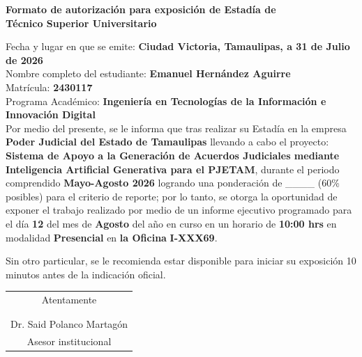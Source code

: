 \documentclass[12pt]{article}
\newcommand{\NombreAlumno}{Emanuel Hernández Aguirre}
\newcommand{\NombreProyecto}{Sistema de Apoyo a la Generación de Acuerdos Judiciales mediante Inteligencia Artificial Generativa para el PJETAM}
\newcommand{\UnidadEconomica}{Poder Judicial del Estado de Tamaulipas}
\newcommand{\nasesorinstitucional}{Dr. Said Polanco Martagón}
\newcommand{\Matricula}           {2430117}  %
\newcommand{\ncuatrimestre}{Mayo-Agosto 2026}
\newcommand{\fechaAutorizacionInforme}               {31 de Julio de 2026}
\newcommand{\DiaEvaluacionPesentacion}{12}
\newcommand{\MesEvaluacionPesentacion}{Agosto}
\newcommand{\HoraEvaluacionPesentacion}{10:00 hrs}
\newcommand{\modalidadEvaluacionPesentacion}{Presencial} %
\newcommand{\tipoAulaOficinaEnlacePesentacion}{la Oficina} %
\newcommand{\AulaEvaluacionOEnlaceMeetPesentacion}{I-XXX69} %
\newcommand{\ncarrera}            {Ingeniería en Tecnologías de la Información e Innovación Digital}
\begin{document}
\begin{center}
{\Large \textbf{Formato de autorización para exposición de Estadía de}}\\[0.125cm]
{\Large \textbf{Técnico Superior Universitario}}\\[0.25cm]
\end{center}

\noindent
Fecha y lugar en que se emite: \textbf{Ciudad Victoria, Tamaulipas, a \fechaAutorizacionInforme } \\[0.125cm]
Nombre completo del estudiante: \textbf{\NombreAlumno} \\[0.125cm]
Matrícula: \textbf{\Matricula}  \\[0.125cm]
Programa Académico: \textbf{\ncarrera}  \\[0.25cm]

\noindent
Por medio del presente, se le informa que tras realizar su Estadía en la empresa \textbf{\UnidadEconomica} llevando a cabo el proyecto: \textbf{\NombreProyecto}, durante el periodo comprendido \textbf{\ncuatrimestre} logrando una ponderación de \_\_\_\_  (60\% posibles) para el criterio de reporte; por lo tanto, se otorga la oportunidad de exponer el trabajo realizado por medio de un informe ejecutivo programado para el día \textbf{\DiaEvaluacionPesentacion} del mes de \textbf{\MesEvaluacionPesentacion} del año en curso en un horario de \textbf{\HoraEvaluacionPesentacion} en modalidad \textbf{\modalidadEvaluacionPesentacion} en \textbf{\tipoAulaOficinaEnlacePesentacion} \textbf{\AulaEvaluacionOEnlaceMeetPesentacion}.

\vspace{0.25cm}

\noindent
Sin otro particular, se le recomienda estar disponible para iniciar su exposición 10 minutos antes de la indicación oficial.

\vspace{0.5cm}

\begin{center}
\begin{tabular}{p{10cm}}
\multicolumn{1}{c}{Atentamente}   \\
 \\
 \\ \hline
\multicolumn{1}{c}{\nasesorinstitucional}   \\
\multicolumn{1}{c}{Asesor institucional}   \\
\end{tabular}
\end{center}
\end{document}
